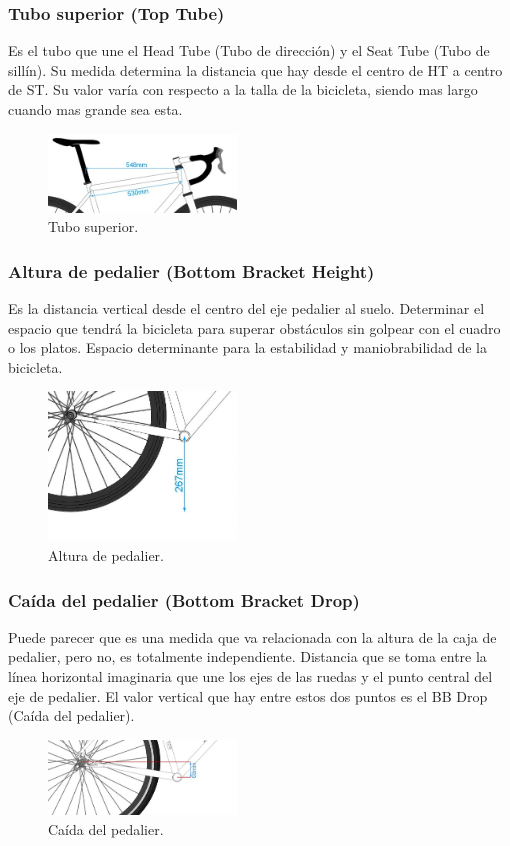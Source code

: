 \documentclass{article}
\begin{document}
\subsubsection{Tubo superior (Top Tube)}
Es el tubo que une el Head Tube (Tubo de dirección) y el Seat Tube (Tubo de sillín). Su medida determina la distancia que hay desde el centro de HT a centro de ST. Su valor varía con respecto a la talla de la bicicleta, siendo mas largo cuando mas grande sea esta.
\begin{figure} [htp]%
    \centering
    \includegraphics[width=50mm]{Imagen6.jpg} %
    \caption{Tubo superior.}
    \label{grafica}
\end{figure}
\subsubsection{Altura de pedalier (Bottom Bracket Height)}
Es la distancia vertical desde el centro del eje pedalier al suelo. Determinar el espacio que tendrá la bicicleta para superar obstáculos sin golpear con el cuadro o los platos. Espacio determinante para la estabilidad y maniobrabilidad de la bicicleta.
\begin{figure} [htp]%
    \centering
    \includegraphics[width=50mm]{Imagen7.png} %
    \caption{Altura de pedalier.}
    \label{grafica}
\end{figure}
\subsubsection{Caída del pedalier (Bottom Bracket Drop)}
Puede parecer que es una medida que va relacionada con la altura de la caja de pedalier, pero no, es totalmente independiente. Distancia que se toma entre la línea horizontal imaginaria que une los ejes de las ruedas y el punto central del eje de pedalier. El valor vertical que hay entre estos dos puntos es el BB Drop (Caída del pedalier).
\begin{figure} [htp]%
    \centering
    \includegraphics[width=50mm]{Imagen8.png} %
    \caption{Caída del pedalier.}
    \label{grafica}
\end{figure}
\newpage
\end{document}
